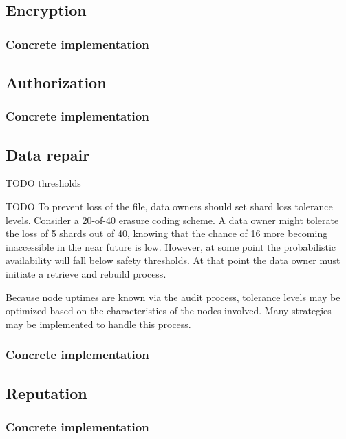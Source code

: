 \documentclass[a4paper,10pt]{article}
\newcommand{\todo}[1]{{\color{red} TODO #1}}
\begin{document}
\subsection{Encryption}

\subsubsection{Concrete implementation}

\subsection{Authorization}

\subsubsection{Concrete implementation}

\subsection{Data repair}

\todo{thresholds}
\todo{
To prevent loss of the file, data owners should set shard loss tolerance levels.
Consider a 20-of-40 erasure coding scheme. A data owner might tolerate the loss
of 5 shards out of 40, knowing that the chance of 16 more becoming inaccessible
in the near future is low. However, at some point the probabilistic availability
will fall below safety thresholds. At that point the data owner must initiate a
retrieve and rebuild process.

Because node uptimes are known via the audit process, tolerance levels may be
optimized based on the characteristics of the nodes involved. Many strategies
may be implemented to handle this process.
}

\subsubsection{Concrete implementation}

\subsection{Reputation}

\subsubsection{Concrete implementation}
\end{document}
